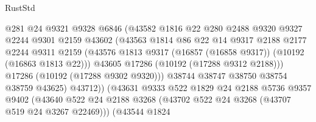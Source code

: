 \begin{lexlean}{RustStd}
\begin{coremodule}
                                  @281
                                  @24
                                  @9321
                                  @9328
                                  @6846
                                  (@43582
                                    @1816
                                    @22
                                    @280
                                    @2488
                                    @9320
                                    @9327
                                    @2244
                                    @9301
                                    @2159
                                    @43602
                                    (@43563
                                      @1814
                                      @86
                                      @22
                                      @14
                                      @9317
                                      @2188
                                      @2177
                                      @2244
                                      @9311
                                      @2159
                                      (@43576
                                        @1813
                                        @9317
                                        (@16857 (@16858 @9317))
                                        (@10192 (@16863 @1813 @22)))
                                      @43605
                                      @17286
                                      (@10192 (@17288 @9312 @2188)))
                                    @17286
                                    (@10192 (@17288 @9302 @9320)))
                                  @38744
                                  @38747
                                  @38750
                                  @38754
                                  @38759
                                  @43625)
                                @43712))
                            (@43631
                              @9333
                              @522
                              @1829
                              @24
                              @2188
                              @5736
                              @9357
                              @9402
                              (@43640
                                @522
                                @24
                                @2188
                                @3268
                                (@43702 @522 @24 @3268 (@43707 @519 @24 @3267 @22469)))
                              (@43544
                                @1824

\end{coremodule}
\end{lexlean}
